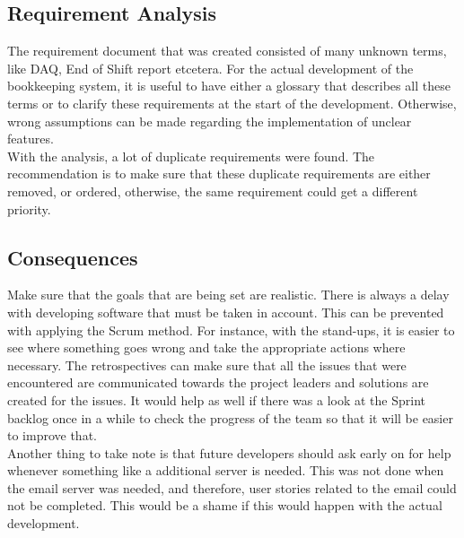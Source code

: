 \documentclass[paper=a4, fontsize=11pt,twoside]{scrartcl}	%
\begin{document}
\subsection{Requirement Analysis}
The requirement document that was created consisted of many unknown terms, like DAQ, End of Shift report etcetera. For the actual development of the bookkeeping system, it is useful to have either a glossary that describes all these terms or to clarify these requirements at the start of the development. Otherwise, wrong assumptions can be made regarding the implementation of unclear features. \\
With the analysis, a lot of duplicate requirements were found. The recommendation is to make sure that these duplicate requirements are either removed, or ordered, otherwise, the same requirement could get a different priority. \\


\subsection{Consequences}
Make sure that the goals that are being set are realistic. There is always a delay with developing software that must be taken in account. This can be prevented with applying the Scrum method. For instance, with the stand-ups, it is easier to see where something goes wrong and take the appropriate actions where necessary. The retrospectives can make sure that all the issues that were encountered are communicated towards the project leaders and solutions are created for the issues. It would help as well if there was a look at the Sprint backlog once in a while to check the progress of the team so that it will be easier to improve that. \\
Another thing to take note is that future developers should ask early on for help whenever something like a additional server is needed. This was not done when the email server was needed, and therefore, user stories related to the email could not be completed. This would be a shame if this would happen with the actual development.

\newpage
\end{document}
